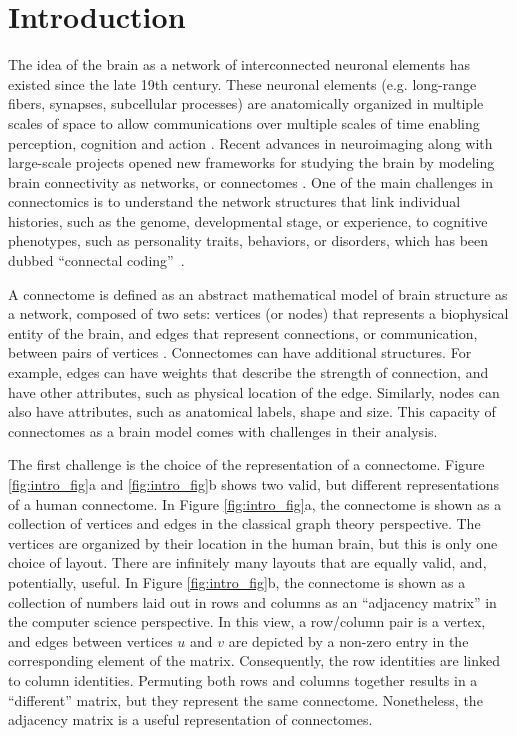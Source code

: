 \section{Introduction}
The idea of the brain as a network of interconnected neuronal elements has existed since the late 19th century. These neuronal elements (e.g. long-range fibers, synapses, subcellular processes) are anatomically organized in multiple scales of space to allow communications over multiple scales of time enabling perception, cognition and action \cite{Shepherd1991-ri,Rieke1997-ok,Russell2016-gt}. Recent advances in neuroimaging \cite{Chung2013-zb,Hagmann2005,Biswal2010-hk} along with large-scale projects opened new frameworks for studying the brain by modeling  brain connectivity as networks, or connectomes \cite{hcp1,zuo2014open,alexander2017open}. One of the main challenges in connectomics is to understand the network structures that link individual histories, such as the genome, developmental stage, or experience, to cognitive phenotypes, such as personality traits, behaviors, or disorders, which has been dubbed ``connectal coding''~\cite{vogelstein2019connectal}.

A connectome is defined as an abstract mathematical model of brain structure as a network, composed of two sets: vertices (or nodes) that represents a biophysical entity of the brain, and edges that represent connections, or communication, between pairs of vertices \cite{sporns2005human,Hagmann2005,vogelstein2019connectal}. Connectomes can have additional structures. For example, edges can have weights that describe the strength of connection, and have other attributes, such as physical location of the edge. Similarly, nodes can also have attributes, such as anatomical labels, shape and size. This capacity of connectomes as a brain model comes with challenges in their analysis. 

The first challenge is the choice of the representation of a connectome. Figure \ref{fig:intro_fig}a and \ref{fig:intro_fig}b shows two valid, but different representations of a human connectome. In Figure \ref{fig:intro_fig}a, the connectome is shown as a collection of vertices and edges in the classical graph theory perspective.
The vertices are organized by their location in the human brain, but this is only one choice of layout. There are infinitely many layouts that are equally valid, and, potentially, useful.
In Figure \ref{fig:intro_fig}b, the connectome is shown as a collection of numbers laid out in rows and columns as an ``adjacency matrix'' in the computer science perspective. In this view, a row/column pair is a vertex, and edges between vertices $u$ and $v$ are depicted by a non-zero entry in the corresponding element of the matrix. Consequently, the row identities are linked to column identities. Permuting both rows and columns together results in a ``different'' matrix, but they represent the same connectome. Nonetheless, the adjacency matrix is a useful representation of connectomes.

